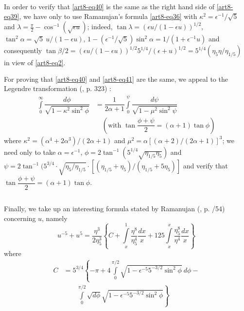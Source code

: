 In order to verify that \eqref{art8-eq40} is the same as the right hand side of \eqref{art8-eq39}, we have only to use Ramanujan's formula \eqref{art8-eq36} with $\kappa^{2}=\epsilon^{-1}/\sqrt{5}$ and $\lambda=\frac{\pi}{2}-\cos^{-1}(\sqrt{\epsilon u})$; indeed, $\tan \lambda=(\epsilon u/(1-\epsilon u))^{1/2}$, $\tan^{2}\alpha=\sqrt{5} \ u/(1-\epsilon u)$, $1-(\epsilon^{-1}/\sqrt{5})\sin^{2}\alpha=1/(1+\epsilon^{-1}u)$ and consequently $\tan\beta/2=(\epsilon u/(1-\epsilon u))^{1/2}5^{1/4}/(\epsilon+u)^{1/2}=5^{1/4}(\eta_{5}\eta/\eta_{1/5})$ in view of \eqref{art8-eq2}.

For proving that \eqref{art8-eq40} and \eqref{art8-eq41} are the same, we appeal to the Legendre transformation (\cite{art8-key4}, p. 323) :
\begin{align*}
\int\limits^{\infty}_{0}\dfrac{d\phi}{\sqrt{1-\kappa^{2}\sin^{2}\phi}} &=\dfrac{1}{2\alpha+1}\int\limits^{\psi}_{0}\dfrac{d\psi}{\sqrt{1-\mu^{2}\sin^{2}\psi}}\\
&\quad (\text{with } \tan\dfrac{\phi+\psi}{2}=(\alpha+1)\tan\phi)
\end{align*}
where $\kappa^{2}=(\alpha^{4}+2\alpha^{3})/(2\alpha+1)$ and $\mu^{2}=\alpha[(\alpha+2)/(2\alpha+1)]^{3}$; we need only to take $\alpha=\epsilon^{-1}$, $\phi=2  \tan^{-1}(5^{1/4}\sqrt{\eta_{1/5}\eta_{5}})$ and $\psi=2  \tan^{-1} (5^{3/4}\cdot \sqrt{\eta_{5}/\eta_{1/5}}\cdot [(\eta_{1/5}+\eta_{5})/(\eta_{1/5}+5\eta_{5})]$ and verify that $\tan \dfrac{\phi+\psi}{2}=(\alpha+1)\tan \phi$.

\subsection{}\label{art8-sec3.6}
Finally, we take up an interesting formula stated by Ramanujan (\cite{art8-key11}, p. /54) concerning $u$, namely
\setcounter{equation}{43}
\begin{equation}
u^{-5}+u^{5}=\dfrac{\eta^{3}}{2\eta^{3}_{5}}\left\{C+\int\limits^{1}_{x}\dfrac{\eta^{8}}{\eta^{4}_{5}}\dfrac{dx}{x}+125\int\limits^{x}_{x}\frac{\eta^{8}_{5}}{\eta^{4}}\dfrac{dx}{x}\right\}\label{art8-eq44}
\end{equation}
where
\begin{align*}
C &= 5^{3/4}\left\{-\pi +4 \int\limits^{\pi/2}_{0}\sqrt{1-\epsilon^{-5}5^{-3/2}\sin^{2}\phi} \ d\phi -\right.\\
  &\qquad \left.\int\limits^{\pi/2}_{0}\sqrt{d\phi}{\sqrt{1-\epsilon^{-5}5^{-3/2}\sin^{2}\phi}}\right\}
\end{align*}\pageoriginale

